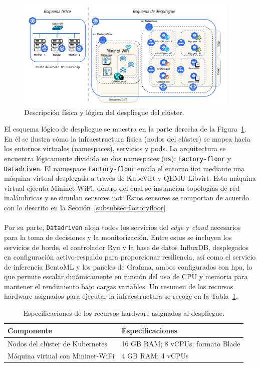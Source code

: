 \begin{figure}[ht!]
    \centering
    \includegraphics[width=0.95\textwidth]{fig/08_datadriven/datadriven_09.drawio.pdf}
    \caption{Descripción física y lógica del despliegue del clúster.}
    \label{fig:cluster-scheme}
\end{figure}

El esquema lógico de despliegue se muestra en la parte derecha de la Figura~\ref{fig:cluster-scheme}. En él se ilustra cómo la infraestructura física (nodos del clúster) se mapea hacia los entornos virtuales (namespaces), servicios y pods. La arquitectura se encuentra lógicamente dividida en dos namespaces (\texttt{ns}): \texttt{Factory-floor} y \texttt{Datadriven}. El namespace \texttt{Factory-floor} emula el entorno \gls{iiot} mediante una máquina virtual desplegada a través de KubeVirt y QEMU-Libvirt. Esta máquina virtual ejecuta Mininet-WiFi, dentro del cual se instancian topologías de red inalámbricas y se simulan sensores \gls{iiot}. Estos sensores se comportan de acuerdo con lo descrito en la Sección~\ref{subsubsec:factoryfloor}. \\
\\
Por su parte, \texttt{Datadriven} aloja todos los servicios del \textit{edge} y \textit{cloud} necesarios para la toma de decisiones y la monitorización. Entre estos se incluyen los servicios de borde, el controlador Ryu y la base de datos InfluxDB, desplegados en configuración activo-respaldo para proporcionar resiliencia, así como el servicio de inferencia BentoML y los paneles de Grafana, ambos configurados con \gls{hpa}, lo que permite escalar dinámicamente en función del uso de CPU y memoria para mantener el rendimiento bajo cargas variables. Un resumen de los recursos hardware asignados para ejecutar la infraestructura se recoge en la Tabla~\ref{tab:hardware-specs}.

\begin{table}[ht!]
\centering
\begin{tabular}{|p{6cm}|p{7cm}|}
\hline
\textbf{Componente} & \textbf{Especificaciones}\\
\hline
Nodos del clúster de Kubernetes & 16 GB RAM; 8 vCPUs; formato Blade\\
\hline
Máquina virtual con Mininet-WiFi & 4 GB RAM; 4 vCPUs\\
\hline
\end{tabular}
\caption{Especificaciones de los recursos hardware asignados al despliegue.}
\label{tab:hardware-specs}
\end{table}

